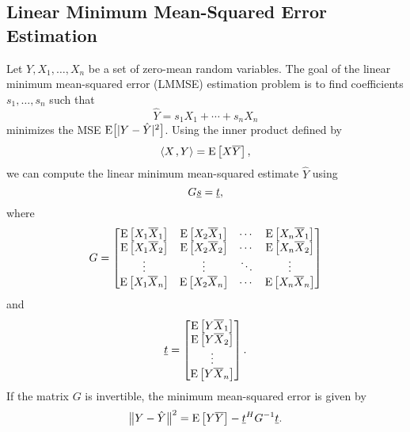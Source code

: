 \subsection{Linear Minimum Mean-Squared Error Estimation}

Let $Y, X_1, \ldots, X_n$ be a set of zero-mean random variables.
The goal of the linear minimum mean-squared error (LMMSE) estimation  problem is to find coefficients $s_1, \ldots, s_n$ such that
\[ \hat{Y} = s_1 X_1 + \cdots + s_n X_n \]
minimizes the MSE $\mathrm{E} \big[ |Y-\hat{Y}|^2 \big]$.
Using the inner product defined by
\begin{equation} \label{equation:ExpectationInnerProduct}
{\left\langle  X  \mskip2mu ,  Y  \right\rangle} = \mathrm{E} \left[ X \overline{Y} \right],
\end{equation}
we can compute the linear minimum mean-squared estimate $\hat{Y}$ using
\begin{equation*}
G \underline{s} = \underline{t},
\end{equation*}
where
\begin{equation*}
G = \begin{bmatrix}
\mathrm{E} \left[ X_1 \overline{X}_1 \right]
& \mathrm{E} \left[ X_2 \overline{X}_1 \right] & \cdots
& \mathrm{E} \left[ X_n \overline{X}_1 \right] \\
\mathrm{E} \left[ X_1 \overline{X}_2 \right]
& \mathrm{E} \left[ X_2 \overline{X}_2 \right] & \cdots
& \mathrm{E} \left[ X_n \overline{X}_2 \right] \\
\vdots & \vdots & \ddots & \vdots \\
\mathrm{E} \left[ X_1 \overline{X}_n \right]
& \mathrm{E} \left[ X_2 \overline{X}_n \right] & \cdots
& \mathrm{E} \left[ X_n \overline{X}_n \right] \\
\end{bmatrix}
\end{equation*}
and
\begin{equation*}
\underline{t} = \begin{bmatrix}
\mathrm{E} \left[ Y \overline{X}_1 \right] \\
\mathrm{E} \left[ Y \overline{X}_2 \right] \\ \vdots \\
\mathrm{E} \left[ Y \overline{X}_n \right] \end{bmatrix} .
\end{equation*}
If the matrix $G$ is invertible, the minimum mean-squared error is given by
\begin{equation*}
\big\| Y - \hat{Y} \big\|^2
= \mathrm{E} \left[ Y \overline{Y} \right]
- \underline{t}^H G^{-1} \underline{t} .
\end{equation*}


